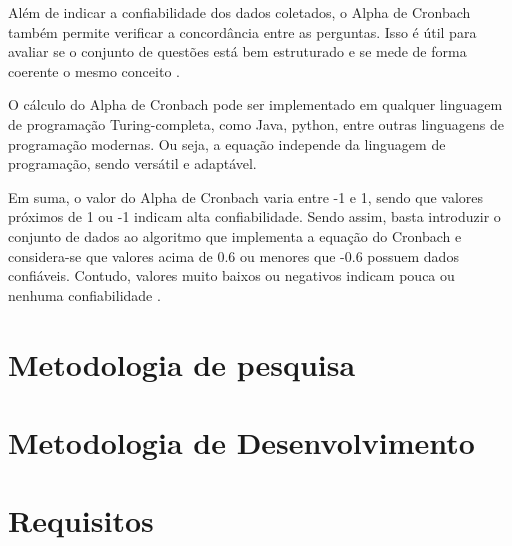 

Além de indicar a confiabilidade dos dados coletados, o Alpha de Cronbach também permite verificar a concordância entre as perguntas. Isso é útil para avaliar se o conjunto de questões está bem estruturado e se mede de forma coerente o mesmo conceito \cite{cronbach_1951}.

O cálculo do Alpha de Cronbach pode ser implementado em qualquer linguagem de programação Turing-completa, como Java, python, entre outras linguagens de programação modernas. Ou seja, a equação independe da linguagem de programação, sendo versátil e adaptável.

Em suma, o valor do Alpha de Cronbach varia entre -1 e 1, sendo que valores próximos de 1 ou -1 indicam alta confiabilidade. Sendo assim, basta introduzir o conjunto de dados ao algoritmo que implementa a equação do Cronbach e considera-se que valores acima de 0.6 ou menores que -0.6 possuem dados confiáveis. Contudo, valores muito baixos ou negativos indicam pouca ou nenhuma confiabilidade \cite{cronbach_1951}.

\section{Metodologia de pesquisa}


\section{Metodologia de Desenvolvimento}


\section{Requisitos}
\label{sec:requisitos}


